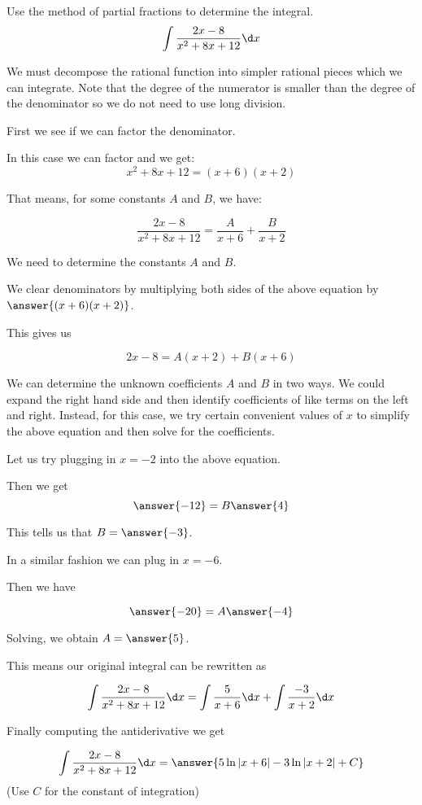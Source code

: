 \documentclass{ximera}
\author{Jason Miller}
\begin{document}
\begin{exercise}
Use the method of partial fractions to determine the integral.
\[
\int \frac{2x-8}{x^{2}+8x+12} \d x
\]

We must decompose the rational function into simpler rational pieces which we can integrate. 
Note that the degree of the numerator is smaller than the degree of the denominator so we do not need 
to use long division. 

First we see if we can factor the denominator. 

In this case we can factor and we get:
\[
x^{2}+8x+12=(x+6)(x+2)
\]

That means, for some constants $A$ and $B$, we have:

\[
\frac{2x-8}{x^{2}+8x+12}= \frac{A}{x+6} + \frac{B}{x+2}
\]

We need to determine the constants $A$ and $B$. 

We clear denominators by multiplying both sides of the above equation by $\answer{(x+6)(x+2)}$. 

This gives us 

\[
2x-8=A(x+2) + B(x+6)
\]

We can determine the unknown coefficients $A$ and $B$ in two ways. 
We could expand the right hand side and then identify coefficients of like terms on the left and right.
Instead, for this case, we try certain convenient values of $x$ to simplify the above equation and then solve for the coefficients. 

Let us try plugging in $x=-2$ into the above equation. 

Then we get 
\[
\answer{-12 }= B\answer{4}
\]

This tells us that $B=\answer{ -3}$. 


In a similar fashion we can plug in $x=-6$. 

Then we have 

\[
\answer{-20}=A\answer{-4}
\]

Solving, we obtain $A=\answer{5}$. 

\begin{exercise}
This means our original integral can be rewritten as 

\[
\int \frac{2x-8}{x^{2}+8x+12} \d x= \int \frac{5}{x+6} \d x + \int \frac{-3}{x+2} \d x
\]

 Finally computing the antiderivative we get 

\[
\int \frac{2x-8}{x^{2}+8x+12} \d x= \answer{ 5\ln|x+6|-3\ln|x+2| + C }
\]
(Use $C$ for the constant of integration)

\end{exercise}
\end{exercise}
\end{document}
